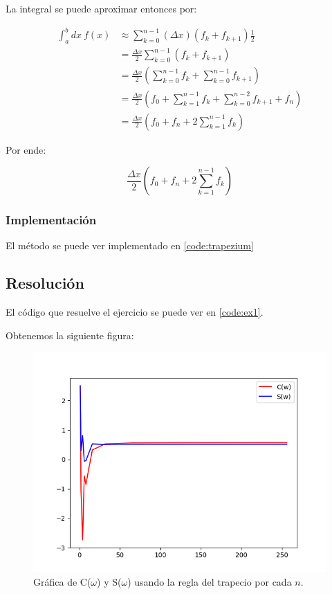 \newpage 

La integral se puede aproximar entonces por:

\begin{align*}
	\int_{a}^{b} dx ~ f(x)
	&\approx \sum_{k = 0}^{n - 1} (\Delta x)( f_k + f_{k+1} )\frac{1}{2} \\
	&= \frac{\Delta x}{2} \sum_{k = 0}^{n - 1} ( f_k + f_{k+1}) \\
	&= \frac{\Delta x}{2} (\sum_{k = 0}^{n - 1}  f_k + \sum_{k = 0}^{n - 1} f_{k+1}) \\
	&= 
	\frac{\Delta x}{2}
	(
	f_0 + \sum_{k = 1}^{n - 1}  f_k 
	+ \sum_{k = 0}^{n - 2} f_{k+1}
	+ f_n
	) \\
	&= \frac{\Delta x}{2}(f_0 + f_n  + 2 \sum_{k = 1}^{n - 1}  f_k )
\end{align*}


Por ende: 

\begin{equation}
\boxed{\frac{\Delta x}{2}(f_0 + f_n  + 2 \sum_{k = 1}^{n - 1}  f_k )}
\end{equation}



\subsubsection{Implementación}

El método se puede ver implementado en \ref{code:trapezium}


\newpage 

\subsection{Resolución}

El código que resuelve el ejercicio se puede ver en \ref{code:ex1}. 

Obtenemos la siguiente figura:

\begin{figure}[H]
	\includegraphics[width=\linewidth]{figures/ex1.png}
	\caption{Gráfica de C($\omega$) y S($\omega$) usando la regla del trapecio por cada $n$.}
	\label{fig:c_s_subdiv}
\end{figure}


